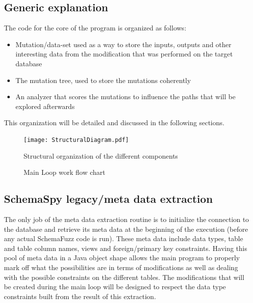 \documentclass{article}
\begin{document}
\begin{empfile}
		\subsection{Generic explanation}
The code for the core of the program is organized as follows:
		\begin{itemize}
		\item{Mutation/data-set used as a way to store the inputs, outputs and other interesting data from the modification that was performed on the target database}
		\item{The mutation tree, used to store the mutations coherently}
		\item{An analyzer that scores the mutations to influence the paths that will be explored afterwards}
		\end{itemize}
This organization will be detailed and discussed in the following sections.

\begin{figure} [h!]
\texttt{[image: StructuralDiagram.pdf]}
\caption{Structural organization of the different components}
\end{figure}

		 \clearpage
\begin{figure} [h!]
\centering

\caption{Main Loop work flow chart}
\end{figure}
		 \clearpage		 
		 
		 
		 
		\subsection{SchemaSpy legacy/meta data extraction}
The only job of the meta data extraction routine is to initialize the connection to the database and retrieve its meta data at the   beginning of the execution (before any actual SchemaFuzz code is run). These meta data include data types, table and table column names, views and foreign/primary key constraints. Having this pool of meta data in a Java object shape allows the main program to properly mark off what the possibilities are in terms of modifications as well as dealing with the possible constraints on the different tables. The modifications that will be created during the main loop will be designed to respect the data type constraints built from the result of this extraction. 


\end{empfile}
\end{document}
